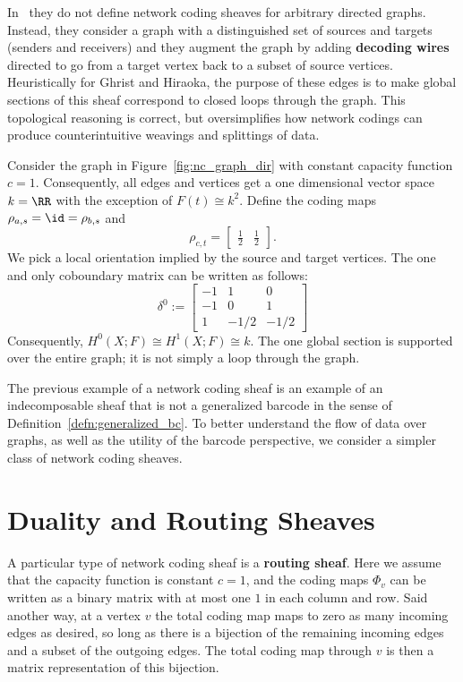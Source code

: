 In~\cite{GH-ncs} they do not define network coding sheaves for arbitrary directed graphs. Instead, they consider a graph with a distinguished set of sources and targets (senders and receivers) and they augment the graph by adding \textbf{decoding wires} directed to go from a target vertex back to a subset of source vertices. Heuristically for Ghrist and Hiraoka, the purpose of these edges is to make global sections of this sheaf correspond to closed loops through the graph. This topological reasoning is correct, but oversimplifies how network codings can produce counterintuitive weavings and splittings of data.

\begin{ex}
	Consider the graph in Figure~\ref{fig:nc_graph_dir} with constant capacity function $c = 1$. Consequently, all edges and vertices get a one dimensional vector space $k=\RR$ with the exception of $F(t)\cong k^2$. Define the coding maps $\rho_{a,s}=\id=\rho_{b,s}$ and
	\[
		\rho_{c,t}=\begin{bmatrix} \frac{1}{2} & \frac{1}{2}\end{bmatrix}.
	\]
	We pick a local orientation implied by the source and target vertices. The one and only coboundary matrix can be written as follows:
	\[
		\delta^0:=\begin{bmatrix}
				-1 & 1 & 0 \\
				-1 & 0 & 1 \\
				1 & -1/2 & -1/2
		\end{bmatrix}
	\]
	Consequently, $H^0(X;F)\cong H^1(X;F)\cong k$. The one global section is supported over the entire graph; it is not simply a loop through the graph.
\end{ex}

The previous example of a network coding sheaf is an example of an indecomposable sheaf that is not a generalized barcode in the sense of Definition~\ref{defn:generalized_bc}. To better understand the flow of data over graphs, as well as the utility of the barcode perspective, we consider a simpler class of network coding sheaves.

\section{Duality and Routing Sheaves}

\begin{defn}
	A particular type of network coding sheaf is a \textbf{routing sheaf}. Here we assume that the capacity function is constant $c = 1$, and the coding maps $\Phi_v$ can be written as a binary matrix with at most one $1$ in each column and row. Said another way, at a vertex $v$ the total coding map maps to zero as many incoming edges as desired, so long as there is a bijection of the remaining incoming edges and a subset of the outgoing edges. The total coding map through $v$ is then a matrix representation of this bijection.
\end{defn}

